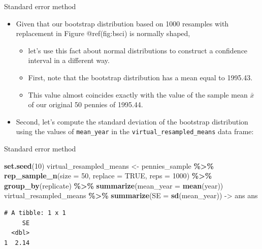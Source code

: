 \documentclass[
  ignorenonframetext,
]{beamer}
\newenvironment{Shaded}{\begin{snugshade}}{\end{snugshade}}
\newcommand{\AttributeTok}[1]{\textcolor[rgb]{0.13,0.29,0.53}{#1}}
\newcommand{\ConstantTok}[1]{\textcolor[rgb]{0.56,0.35,0.01}{#1}}
\newcommand{\DecValTok}[1]{\textcolor[rgb]{0.00,0.00,0.81}{#1}}
\newcommand{\FunctionTok}[1]{\textcolor[rgb]{0.13,0.29,0.53}{\textbf{#1}}}
\newcommand{\NormalTok}[1]{#1}
\newcommand{\OtherTok}[1]{\textcolor[rgb]{0.56,0.35,0.01}{#1}}
\newcommand{\SpecialCharTok}[1]{\textcolor[rgb]{0.81,0.36,0.00}{\textbf{#1}}}
\begin{document}
\begin{frame}[fragile]{Standard error method}
\protect\hypertarget{standard-error-method}{}
\begin{itemize}
\item
  Given that our bootstrap distribution based on 1000 resamples with
  replacement in Figure @ref(fig:bsci) is normally shaped,

  \begin{itemize}
  \item
    let's use this fact about normal distributions to construct a
    confidence interval in a different way.
  \item
    First, note that the bootstrap distribution has a mean equal to
    1995.43.
  \item
    This value almost coincides exactly with the value of the sample
    mean \(\bar{x}\) of our original 50 pennies of 1995.44.
  \end{itemize}
\item
  Second, let's compute the standard deviation of the bootstrap
  distribution using the values of \texttt{mean\_year} in the
  \texttt{virtual\_resampled\_means} data frame:
\end{itemize}
\end{frame}

\begin{frame}[fragile]{Standard error method}
\protect\hypertarget{standard-error-method-1}{}
\begin{Shaded}
\begin{Highlighting}[]
\FunctionTok{set.seed}\NormalTok{(}\DecValTok{10}\NormalTok{)}
\NormalTok{virtual\_resampled\_means }\OtherTok{\textless{}{-}}\NormalTok{ pennies\_sample }\SpecialCharTok{\%\textgreater{}\%} 
  \FunctionTok{rep\_sample\_n}\NormalTok{(}\AttributeTok{size =} \DecValTok{50}\NormalTok{, }\AttributeTok{replace =} \ConstantTok{TRUE}\NormalTok{, }\AttributeTok{reps =} \DecValTok{1000}\NormalTok{) }\SpecialCharTok{\%\textgreater{}\%} 
  \FunctionTok{group\_by}\NormalTok{(replicate) }\SpecialCharTok{\%\textgreater{}\%} 
  \FunctionTok{summarize}\NormalTok{(}\AttributeTok{mean\_year =} \FunctionTok{mean}\NormalTok{(year))}
\NormalTok{virtual\_resampled\_means }\SpecialCharTok{\%\textgreater{}\%} 
  \FunctionTok{summarize}\NormalTok{(}\AttributeTok{SE =} \FunctionTok{sd}\NormalTok{(mean\_year)) }\OtherTok{{-}\textgreater{}}\NormalTok{ ans}
\NormalTok{ans}
\end{Highlighting}
\end{Shaded}

\begin{verbatim}
# A tibble: 1 x 1
     SE
  <dbl>
1  2.14
\end{verbatim}
\end{frame}
\end{document}
